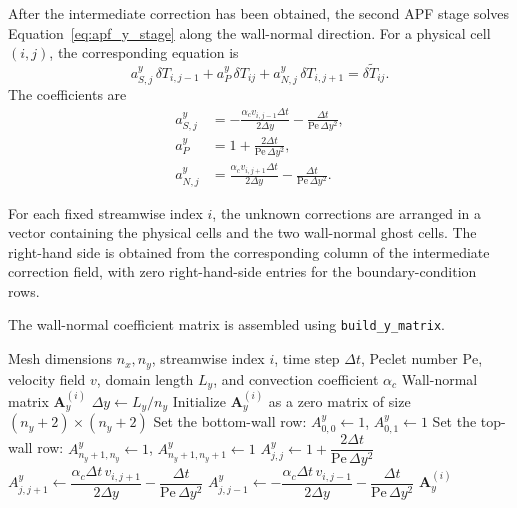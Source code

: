 After the intermediate correction has been obtained, the
second APF stage solves
Equation~\eqref{eq:apf_y_stage} along the wall-normal
direction. For a physical cell $(i,j)$, the corresponding
equation is
\begin{equation}
\boxed{
a^y_{S,j}\,\delta T_{i,j-1}
+
a^y_P\,\delta T_{ij}
+
a^y_{N,j}\,\delta T_{i,j+1}
=
\delta\widetilde{T}_{ij}.
}
\label{eq:apf_y_tridiagonal}
\end{equation}
The coefficients are
\begin{align}
a^y_{S,j}
&=
-\frac{\alpha_c v_{i,j-1}\Delta t}{2\Delta y}
-\frac{\Delta t}{\mathrm{Pe}\,\Delta y^2},
\label{eq:apf_y_south}
\\[0.15cm]
a^y_P
&=
1+\frac{2\Delta t}{\mathrm{Pe}\,\Delta y^2},
\label{eq:apf_y_center}
\\[0.15cm]
a^y_{N,j}
&=
\frac{\alpha_c v_{i,j+1}\Delta t}{2\Delta y}
-\frac{\Delta t}{\mathrm{Pe}\,\Delta y^2}.
\label{eq:apf_y_north}
\end{align}

For each fixed streamwise index $i$, the unknown corrections
are arranged in a vector containing the physical cells and
the two wall-normal ghost cells. The right-hand side is
obtained from the corresponding column of the intermediate
correction field, with zero right-hand-side entries for the
boundary-condition rows.

The wall-normal coefficient matrix is assembled using
\texttt{build\_y\_matrix}.

\begin{algorithm}[H]
\caption{Construction of the Wall-Normal Coefficient Matrix}
\label{alg:apf_build_y_matrix}
\begin{algorithmic}[1]
\Require Mesh dimensions $n_x,n_y$, streamwise index $i$,
time step $\Delta t$, Peclet number $\mathrm{Pe}$, velocity
field $v$, domain length $L_y$, and convection coefficient
$\alpha_c$
\Ensure Wall-normal matrix $\mathbf{A}_y^{(i)}$
\State $\Delta y \gets L_y/n_y$
\State Initialize $\mathbf{A}_y^{(i)}$ as a zero matrix of
size $(n_y+2)\times(n_y+2)$
\State Set the bottom-wall row:
$A^y_{0,0}\gets1$, $A^y_{0,1}\gets1$
\State Set the top-wall row:
$A^y_{n_y+1,n_y}\gets1$,
$A^y_{n_y+1,n_y+1}\gets1$
    \State $A^y_{j,j}
    \gets 1+\dfrac{2\Delta t}{\mathrm{Pe}\,\Delta y^2}$
    \State $A^y_{j,j+1}
    \gets \dfrac{\alpha_c\Delta t\,v_{i,j+1}}{2\Delta y}
    -\dfrac{\Delta t}{\mathrm{Pe}\,\Delta y^2}$
    \State $A^y_{j,j-1}
    \gets -\dfrac{\alpha_c\Delta t\,v_{i,j-1}}{2\Delta y}
    -\dfrac{\Delta t}{\mathrm{Pe}\,\Delta y^2}$
\EndFor
\State \Return $\mathbf{A}_y^{(i)}$
\end{algorithmic}
\end{algorithm}

